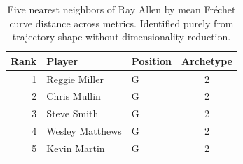 \begin{table}[htbp]
  \centering\small
  \begin{tabular}{rllc}
    \toprule
    Rank & Player & Position & Archetype \\
    \midrule
    1 & Reggie Miller & G & 2 \\
    2 & Chris Mullin & G & 2 \\
    3 & Steve Smith & G & 2 \\
    4 & Wesley Matthews & G & 2 \\
    5 & Kevin Martin & G & 2 \\
    \bottomrule
  \end{tabular}
  \caption{Five nearest neighbors of Ray Allen by mean Fr\'{e}chet curve distance across metrics. Identified purely from trajectory shape without dimensionality reduction.}
  \label{tab:Ray_Allen_frechet_curve_neighbors}
\end{table}

